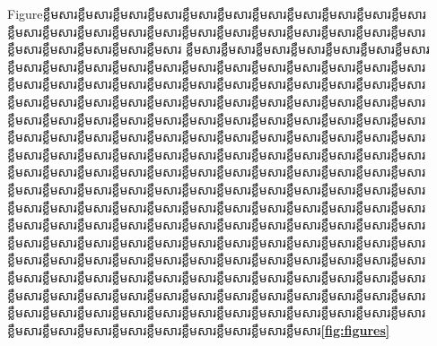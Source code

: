 \documentclass[a4paper,12pt,twoside]{book}
\theoremstyle{plain}
\theoremstyle{definition}
\theoremstyle{remark}
\begin{document}
  Figureខ្លឹមសារខ្លឹមសារខ្លឹមសារខ្លឹមសារខ្លឹមសារខ្លឹមសារខ្លឹមសារខ្លឹមសារខ្លឹមសារខ្លឹមសារខ្លឹមសារខ្លឹមសារខ្លឹមសារខ្លឹមសារខ្លឹមសារខ្លឹមសារខ្លឹមសារខ្លឹមសារខ្លឹមសារខ្លឹមសារខ្លឹមសារខ្លឹមសារខ្លឹមសារខ្លឹមសារខ្លឹមសារខ្លឹមសារខ្លឹមសារខ្លឹមសារ ខ្លឹមសារខ្លឹមសារខ្លឹមសារខ្លឹមសារខ្លឹមសារខ្លឹមសារខ្លឹមសារខ្លឹមសារខ្លឹមសារខ្លឹមសារខ្លឹមសារខ្លឹមសារខ្លឹមសារខ្លឹមសារខ្លឹមសារខ្លឹមសារខ្លឹមសារខ្លឹមសារខ្លឹមសារខ្លឹមសារខ្លឹមសារខ្លឹមសារខ្លឹមសារខ្លឹមសារខ្លឹមសារខ្លឹមសារខ្លឹមសារខ្លឹមសារខ្លឹមសារខ្លឹមសារខ្លឹមសារខ្លឹមសារខ្លឹមសារខ្លឹមសារខ្លឹមសារខ្លឹមសារខ្លឹមសារខ្លឹមសារខ្លឹមសារខ្លឹមសារខ្លឹមសារខ្លឹមសារខ្លឹមសារខ្លឹមសារខ្លឹមសារខ្លឹមសារខ្លឹមសារខ្លឹមសារខ្លឹមសារខ្លឹមសារខ្លឹមសារខ្លឹមសារខ្លឹមសារខ្លឹមសារខ្លឹមសារខ្លឹមសារខ្លឹមសារខ្លឹមសារខ្លឹមសារខ្លឹមសារខ្លឹមសារខ្លឹមសារខ្លឹមសារខ្លឹមសារខ្លឹមសារខ្លឹមសារខ្លឹមសារខ្លឹមសារខ្លឹមសារខ្លឹមសារខ្លឹមសារខ្លឹមសារខ្លឹមសារខ្លឹមសារខ្លឹមសារខ្លឹមសារខ្លឹមសារខ្លឹមសារខ្លឹមសារខ្លឹមសារខ្លឹមសារខ្លឹមសារខ្លឹមសារខ្លឹមសារខ្លឹមសារខ្លឹមសារខ្លឹមសារខ្លឹមសារខ្លឹមសារខ្លឹមសារខ្លឹមសារខ្លឹមសារខ្លឹមសារខ្លឹមសារខ្លឹមសារខ្លឹមសារខ្លឹមសារខ្លឹមសារខ្លឹមសារខ្លឹមសារខ្លឹមសារខ្លឹមសារខ្លឹមសារខ្លឹមសារខ្លឹមសារខ្លឹមសារខ្លឹមសារខ្លឹមសារខ្លឹមសារខ្លឹមសារខ្លឹមសារខ្លឹមសារខ្លឹមសារខ្លឹមសារខ្លឹមសារខ្លឹមសារខ្លឹមសារខ្លឹមសារខ្លឹមសារខ្លឹមសារខ្លឹមសារខ្លឹមសារខ្លឹមសារខ្លឹមសារខ្លឹមសារខ្លឹមសារខ្លឹមសារខ្លឹមសារខ្លឹមសារខ្លឹមសារខ្លឹមសារខ្លឹមសារខ្លឹមសារខ្លឹមសារខ្លឹមសារខ្លឹមសារខ្លឹមសារខ្លឹមសារខ្លឹមសារខ្លឹមសារខ្លឹមសារខ្លឹមសារខ្លឹមសារខ្លឹមសារខ្លឹមសារខ្លឹមសារខ្លឹមសារខ្លឹមសារខ្លឹមសារខ្លឹមសារខ្លឹមសារខ្លឹមសារខ្លឹមសារខ្លឹមសារខ្លឹមសារខ្លឹមសារខ្លឹមសារខ្លឹមសារខ្លឹមសារខ្លឹមសារខ្លឹមសារខ្លឹមសារខ្លឹមសារខ្លឹមសារខ្លឹមសារខ្លឹមសារខ្លឹមសារខ្លឹមសារខ្លឹមសារខ្លឹមសារខ្លឹមសារខ្លឹមសារខ្លឹមសារខ្លឹមសារខ្លឹមសារខ្លឹមសារខ្លឹមសារខ្លឹមសារខ្លឹមសារខ្លឹមសារខ្លឹមសារខ្លឹមសារខ្លឹមសារខ្លឹមសារខ្លឹមសារខ្លឹមសារខ្លឹមសារខ្លឹមសារខ្លឹមសារខ្លឹមសារខ្លឹមសារខ្លឹមសារខ្លឹមសារខ្លឹមសារខ្លឹមសារខ្លឹមសារ{\textbf{\cref*{fig:figures}}}
\end{document}
